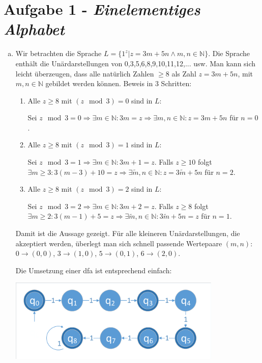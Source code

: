 \documentclass{article}
\begin{document}
\section*{Aufgabe 1 - \textit{Einelementiges Alphabet}}
\begin{enumerate}[a)]
	\item Wir betrachten die Sprache $L = \{1^z | z = 3m + 5n \land m,n\in \mathbb{N}\}$. Die Sprache enthält die Unärdarstellungen von 0,3,5,6,8,9,10,11,12,... usw. Man kann sich leicht überzeugen, dass alle natürlich Zahlen $\ge 8$ als Zahl $z = 3m + 5n$, mit $m,n \in \mathbb{N}$ gebildet werden können. Beweis in 3 Schritten:
	\begin{enumerate}[1.]
		\item Alle $z \ge 8$ mit  $(z \mod 3) = 0$ sind in $L$:
		
		Sei $z \mod 3 = 0 \Rightarrow \exists m \in \mathbb{N} : 3m= z \Rightarrow \exists m,n \in\mathbb{N}: z = 3m + 5n$ für $n = 0$.
		
		\item Alle $z \ge 8$ mit $(z \mod 3 ) = 1$ sind in $L$:
		
		Sei $z \mod 3 = 1 \Rightarrow \exists m \in\mathbb{N} : 3m + 1 = z$. Falls $ z \ge 10$ folgt $\exists m \ge 3: 3(m-3) + 10 = z \Rightarrow \exists \tilde{m},n \in \mathbb{N}: z = 3\tilde{m} + 5n$ für $n = 2$.
		
		\item Alle $z \ge 8$ mit $(z \mod 3 ) = 2$ sind in $L$:
		
		Sei $z \mod 3 = 2 \Rightarrow \exists m \in\mathbb{N}: 3m +2 = z$. Falls $ z \ge 8$ folgt $\exists m \ge 2 : 3(m-1) + 5 = z \Rightarrow \exists\tilde{m},n \in \mathbb{N}: 3\tilde{m} + 5n = z$ für $n = 1$.
	\end{enumerate}
	Damit ist die Aussage gezeigt. Für alle kleineren Unärdarstellungen, die akzeptiert werden, überlegt man sich schnell passende Wertepaare $(m,n)$: $0 \to (0,0)$, $3 \to (1,0)$, $5 \to (0,1)$, $6 \to (2,0)$.
	
	Die Umsetzung einer dfa ist entsprechend einfach:
	
	\begin{minipage}{\textwidth}
		\centering \includegraphics[width=0.8\textwidth,page=1,trim={2 2 2 4},clip]{dfas.pdf}
	\end{minipage}
	

\end{enumerate}
\end{document}
